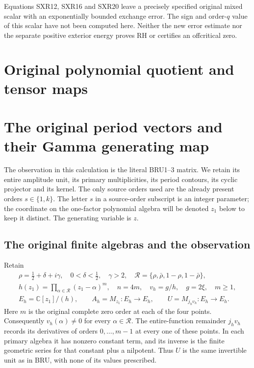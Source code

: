 \documentclass[11pt,a4paper]{article}
\begin{document}
Equations SXR12, SXR16 and SXR20 leave a precisely specified original
mixed scalar with an exponentially bounded exchange error. The sign
and order-$q$ value of this scalar have not been computed here.
Neither the new error estimate nor the separate positive exterior
energy proves RH or certifies an offcritical zero.
\endgroup
\endgroup

\clearpage
\begingroup


\setcounter{equation}{0}
\renewcommand{\theequation}{OPG.\arabic{equation}}
\section*{Original polynomial quotient and tensor maps}
\section{The original period vectors and their Gamma generating map}
\label{opg:sec:OPG}

The observation in this calculation is the literal BRU1--3 matrix. We
retain its entire amplitude unit, its primary multiplicities, its
period contours, its cyclic projector and its kernel. The only source
orders used are the already present orders $s\in\{1,k\}$. The letter
$s$ in a source-order subscript is an integer parameter; the coordinate
on the one-factor polynomial algebra will be denoted $z_1$ below to
keep it distinct. The generating variable is $z$.

\subsection{The original finite algebras and the observation}
Retain
\[
\begin{gathered}
 \rho=\tfrac12+\delta+i\gamma,\quad 0<\delta<\tfrac12,\quad\gamma>2,
 \quad\mathcal R=\{\rho,\bar\rho,1-\rho,1-\bar\rho\},\\
 h(z_1)=\prod_{\alpha\in\mathcal R}(z_1-\alpha)^m,
 \quad n=4m,\quad v_h=g/h,\quad g=2\xi,\quad m\geq1,\\
 E_h=\mathbb C[z_1]/(h),\qquad A_h=M_{z_1}:E_h\to E_h,
 \qquad U=M_{j_hv_h}:E_h\to E_h.
\end{gathered}\tag{OPG1}
\]
Here $m$ is the original complete zero order at each of the four
points. Consequently $v_h(\alpha)\ne0$ for every $\alpha\in\mathcal R$.
The entire-function remainder $j_hv_h$ records its derivatives of
orders $0,\ldots,m-1$ at every one of these points. In each primary
algebra it has nonzero constant term, and its inverse is the finite
geometric series for that constant plus a nilpotent. Thus $U$ is the
same invertible unit as in BRU, with none of its values prescribed.
\end{document}
